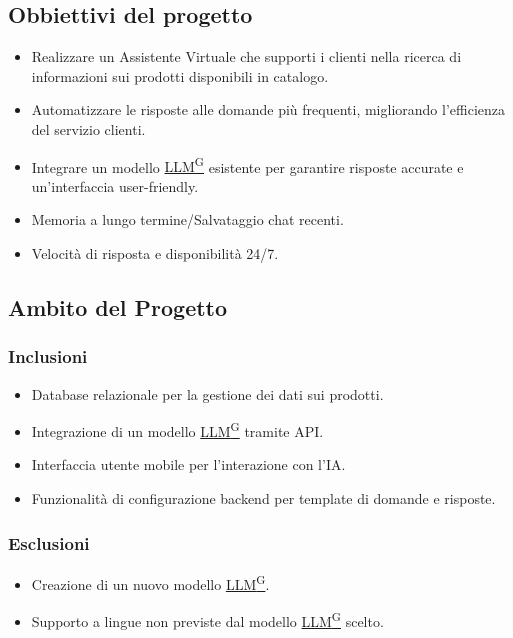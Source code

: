 \documentclass{article}
\begin{document}
    \subsection{Obbiettivi del progetto}
    \begin{itemize}
        \item Realizzare un Assistente Virtuale che supporti i clienti nella ricerca
        di informazioni sui prodotti disponibili in catalogo.
        \item Automatizzare le risposte alle domande più frequenti, migliorando
        l'efficienza del servizio clienti.
        \item Integrare un modello \href{https://code7crusaders.github.io/docs/RTB/documentazione_interna/glossario.html#llm-large-language-model}{LLM\textsuperscript{G}} esistente per garantire risposte accurate e
        un'interfaccia user-friendly.
        \item Memoria a lungo termine/Salvataggio chat recenti.
        \item Velocità di risposta e disponibilità 24/7.
    \end{itemize}

    \subsection{Ambito del Progetto}

        \subsubsection{Inclusioni}
        \begin{itemize}
            \item Database relazionale per la gestione dei dati sui prodotti.
            \item Integrazione di un modello \href{https://code7crusaders.github.io/docs/RTB/documentazione_interna/glossario.html#llm-large-language-model}{LLM\textsuperscript{G}} tramite API.
            \item Interfaccia utente mobile per l'interazione con l'IA.
            \item Funzionalità di configurazione backend per template di domande e risposte.
        \end{itemize}
        \subsubsection{Esclusioni}
        \begin{itemize}
            \item Creazione di un nuovo modello \href{https://code7crusaders.github.io/docs/RTB/documentazione_interna/glossario.html#llm-large-language-model}{LLM\textsuperscript{G}}.
            \item Supporto a lingue non previste dal modello \href{https://code7crusaders.github.io/docs/RTB/documentazione_interna/glossario.html#llm-large-language-model}{LLM\textsuperscript{G}} scelto.
        \end{itemize}
\end{document}
